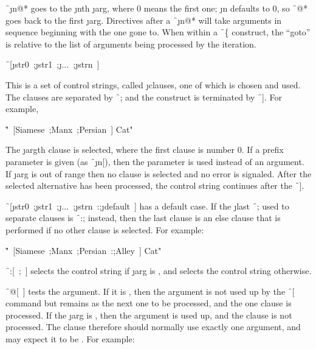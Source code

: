 \f{~\j{n}@*} 
goes to the \j{n}th \j{arg}, where 0 means the first one;
\j{n} defaults to 0, so \f{~@*} goes back to the first \j{arg}.      
Directives after a \f{~\j{n}@*}
will take arguments in sequence beginning with the one gone to.
When within a \f{~\{} construct, the ``goto''
is relative to the list of arguments being processed by the iteration.

\endsubsubsection%


\f{~[\j{str0}~;\j{str1}~;\j{...}~;\j{strn}~]}

This is a set of control strings, called \j{clauses}, one of which is
chosen and used.  The clauses are separated by \f{~;}
and the construct is terminated by \f{~]}.  For example,

\f{"~[Siamese~;Manx~;Persian~] Cat"}
                              
The \j{arg}th
clause is selected, where the first clause is number 0.
If a prefix parameter is given (as \f{~\j{n}[}),
then the parameter is used instead of an argument.    
If \j{arg} is out of range then no clause is selected
and no error is signaled.
After the selected alternative has been processed, the control string
continues after the \f{~]}.

\f{~[\j{str0}~;\j{str1}~;\j{...}~;\j{strn}~:;\j{default}~]}
has a default case.
If the \j{last} \f{~;} used to separate clauses
is \f{~:;} instead, then the last clause is an else clause
that is performed if no other clause is selected.
For example:

\f{"~[Siamese~;Manx~;Persian~:;Alley~] Cat"}

\f{~:[~;~]} 
selects the  control string if \j{arg} is ,
and selects the  control string otherwise.
                                                             
\f{~@[~]} 
tests the argument.  If it is ,           
then the argument is not used up by the \f{~[} command
but remains as the next one to be processed,
and the one clause  is processed.
If the \j{arg} is , then the argument is used up,
and the clause is not processed.
The clause therefore should normally use exactly one argument,
and may expect it to be .
For example:

